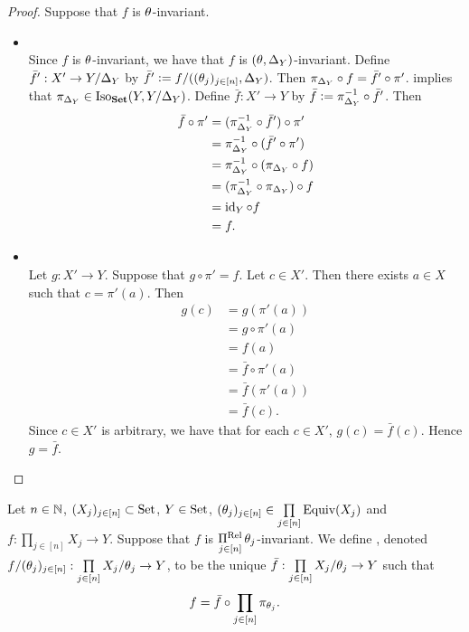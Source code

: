 \begin{proof}
	Suppose that $f$ is $\theta$-invariant. 
	\begin{itemize}
		\item {} \\
		Since $f$ is $\theta$-invariant, we have that $f$ is $(\theta, \Delta_Y)$-invariant. Define $\bar{f}':X' \rightarrow Y/\Delta_Y$ by $\bar{f}' \vcentcolon= f/((\theta_j)_{j \in [n]}, \Delta_Y)$. Then $\pi_{\Delta_Y} \circ f = \bar{f}' \circ \pi'$.  implies that $\pi_{\Delta_Y} \in \operatorname{Iso}_{\text{\textbf{Set}}}(Y, Y/\Delta_Y)$. Define $\bar{f}: X' \rightarrow Y$ by $\bar{f} \vcentcolon= \pi_{\Delta_Y}^{-1} \circ \bar{f}'$. Then 
		\begin{align*}
			\bar{f} \circ \pi' 
			& = (\pi_{\Delta_Y}^{-1} \circ \bar{f}') \circ \pi' \\
			& = \pi_{\Delta_Y}^{-1} \circ (\bar{f}' \circ \pi') \\
			& = \pi_{\Delta_Y}^{-1} \circ (\pi_{\Delta_Y} \circ f) \\
			& = (\pi_{\Delta_Y}^{-1} \circ \pi_{\Delta_Y}) \circ f \\
			& = \operatorname{id}_Y \circ f \\
			& = f. 
		\end{align*} 
		\item {} \\
		Let $g:X' \rightarrow Y$. Suppose that $g \circ \pi' = f$. Let $c \in X'$. Then there exists $a \in X$ such that $c = \pi'(a)$. Then 
		\begin{align*}
			g(c)
			& = g(\pi'(a)) \\
			& = g \circ \pi'(a) \\
			& = f(a) \\
			& = \bar{f} \circ \pi'(a) \\
			& = \bar{f}(\pi'(a)) \\
			& = \bar{f}(c).
		\end{align*}
		Since $c \in X'$ is arbitrary, we have that for each $c \in X'$, $g(c) = \bar{f}(c)$. Hence $g = \bar{f}$. 
	\end{itemize}
\end{proof}

\begin{defn}
	Let $n \in \mathbb{N}$, $(X_j)_{j \in [n]} \subset \text{Set}$, $Y \in \text{Set}$, $(\theta_j)_{j \in [n]} \in \prod\limits_{j \in [n]} \operatorname*{\text{Equiv}}(X_j)$ and $f:\prod\limits_{j \in [n]} X_j \rightarrow Y$. Suppose that $f$ is $\operatorname*{\Pi^{\text{Rel}}}\limits_{j \in [n]} \theta_j$-invariant. We define , denoted $f/(\theta_j)_{j \in [n]}: \prod\limits_{j \in [n]} X_j/\theta_j \rightarrow Y$, to be the unique $\bar{f}: \prod\limits_{j \in [n]} X_j/\theta_j \rightarrow Y$ such that 
	$$f = \bar{f} \circ \prod\limits_{j \in [n]} \pi_{\theta_j}.$$
\end{defn}

